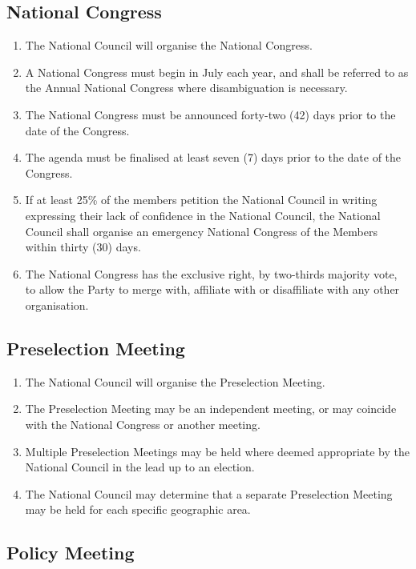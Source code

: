 \documentclass[a4paper,titlepage,8.5pt]{article}
\begin{document}
\subsection{National Congress}

\begin{enumerate}
\item The National Council will organise the National Congress.
\item A National Congress must begin in July each year, and shall be referred to as the Annual National Congress where disambiguation is necessary.
\item The National Congress must be announced forty-two (42) days prior to the date of the Congress.
\item The agenda must be finalised at least seven (7) days prior to the date of the Congress.
\item If at least 25\% of the members petition the National Council in writing expressing their lack of confidence in the National Council, the National Council shall organise an emergency National Congress of the Members within thirty (30) days.
\item The National Congress has the exclusive right, by two-thirds majority vote, to allow the Party to merge with, affiliate with or disaffiliate with any other organisation.
\end{enumerate}

\subsection{Preselection Meeting}

\begin{enumerate}
\item The National Council will organise the Preselection Meeting.
\item The Preselection Meeting may be an independent meeting, or may coincide with the National Congress or another meeting.
\item Multiple Preselection Meetings may be held where deemed appropriate by the National Council in the lead up to an election.
\item The National Council may determine that a separate Preselection Meeting may be held for each specific geographic area.
\end{enumerate}

\subsection{Policy Meeting}
\end{document}
